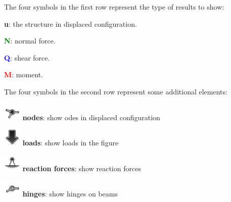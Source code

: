 \documentclass[a4paper,11pt]{report}
\begin{document}
The four symbols in the first row represent the type of results to show:
\begin{trivlist}
	\leftskip=1cm
	\item[]\textbf{u}: the structure in displaced configuration.
	\item[]\textbf{\textcolor{green}{N}}: normal force.
	\item[]\textbf{\textcolor{blue}{Q}}: shear force.
	\item[]\textbf{\textcolor{red}{M}}: moment.
\end{trivlist}
The four symbols in the second row represent some additional elements:
\begin{trivlist}
	\leftskip=1cm
	\item[] \includegraphics[scale = 0.5]{../../icons/node.png} \textbf{nodes}: show odes in displaced configuration
	\item[] \includegraphics[scale = 0.5]{../../icons/load.png} \textbf{loads}: show loads in the figure
	\item[] \includegraphics[scale = 0.5]{../../icons/bearingHV.png} \textbf{reaction forces}: show reaction forces
	\item[] \includegraphics[scale = 0.5]{../../icons/joint.png} \textbf{hinges}: show hinges on beams
\end{trivlist}
\end{document}

